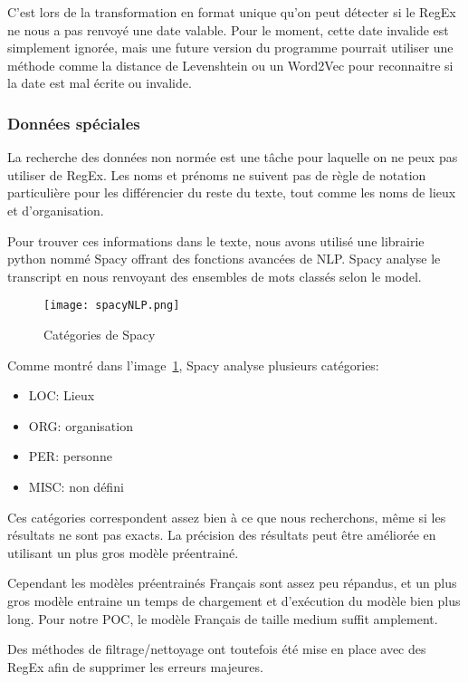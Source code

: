 C'est lors de la transformation en format unique qu'on peut détecter si le RegEx ne nous a pas renvoyé une date valable.
Pour le moment, cette date invalide est simplement ignorée, mais une future version du programme pourrait utiliser une méthode comme la distance de Levenshtein ou un Word2Vec pour reconnaitre si la date est mal écrite ou invalide.




\subsubsection{Données spéciales}
La recherche des données non normée est une tâche pour laquelle on ne peux pas utiliser de RegEx.
Les noms et prénoms ne suivent pas de règle de notation particulière pour les différencier du reste du texte, tout comme les noms de lieux et d'organisation.


Pour trouver ces informations dans le texte, nous avons utilisé une librairie python nommé Spacy offrant des fonctions avancées de NLP\@.
Spacy analyse le transcript en nous renvoyant des ensembles de mots classés selon le model.


\begin{figure}[h!]
  \centering
  \texttt{[image: spacyNLP.png]}
	\caption[]{Catégories de Spacy}
	\label{fig:spacyNLP}
\end{figure}

Comme montré dans l'image~\ref{fig:spacyNLP}, Spacy analyse plusieurs catégories:
\begin{itemize}
\item LOC\@: Lieux
\item ORG\@: organisation
\item PER\@: personne
\item MISC\@: non défini
\end{itemize}

Ces catégories correspondent assez bien à ce que nous recherchons, même si les résultats ne sont pas exacts.
La précision des résultats peut être améliorée en utilisant un plus gros modèle préentrainé.

Cependant les modèles préentrainés Français sont assez peu répandus, et un plus gros modèle entraine un temps de chargement et d'exécution du modèle bien plus long.
Pour notre POC, le modèle Français de taille medium suffit amplement.

Des méthodes de filtrage/nettoyage ont toutefois été mise en place avec des RegEx afin de supprimer les erreurs majeures.

